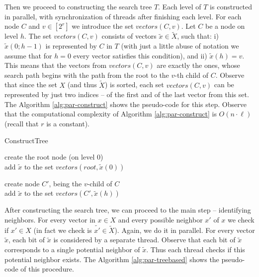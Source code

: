 \documentclass[a4paper]{article}
\begin{document}
Then we proceed to constructing the search tree $T$.
Each level of $T$ is constructed in parallel, with synchronization of threads after finishing each level.
For each node $C$ and $v \in [2^r]$ we introduce the set $vectors(C, v)$. Let $C$ be a node on level $h$.
The set $vectors(C,v)$ consists of vectors $\widetilde x \in \widetilde X$, such that: i) $\widetilde x(0 ; h-1)$ is represented by $C$ in $T$ (with just a little abuse of notation we assume that for $h=0$ every vector satisfies this condition), and ii) $\widetilde x (h) = v$.
This means that the vectors from $vectors(C,v)$ are exactly the ones, whose search path begins with the path from the root to the $v$-th child of $C$. Observe that since the set $X$ (and thus $\widetilde X$) is sorted, each set $vectors(C,v)$ can be represented by just two indices -- of the first and of the last vector from this set.
The Algorithm \ref{alg:par-construct} shows the pseudo-code for this step. Observe that the computational complexity of Algorithm \ref{alg:par-construct} is $O(n \cdot \ell)$ (recall that $r$ is a constant).

\begin{algorithm}[htb]
\small
\caption {ConstructTree}
\label{alg:par-construct}
create the root node (on level 0)\\
		{
			add $\widetilde x$ to the set $vectors(root, \widetilde x(0))$
		}	


{
{
	{
		create node $C'$, being the $v$-child of $C$\\
		{
			add $\widetilde x$ to the set $vectors(C', \widetilde x(h))$
		}	
	}	
}
}

\end{algorithm}

After constructing the search tree, we can proceed to the main step -- identifying neighbors.
For every vector in $x \in X$ and every possible neighbor $x'$ of $x$ we check if $x' \in X$ (in fact we check is $\widetilde{x'} \in \widetilde X$). Again, we do it in parallel.
For every vector $\widetilde x$, each bit of $\widetilde x$ is considered by a separate thread.
Observe that each bit of $\widetilde x$ corresponds to a single potential neighbor of $\widetilde x$. Thus each thread checks if this potential neighbor exists. The Algorithm \ref{alg:par-treebased} shows the pseudo-code of this procedure.
\end{document}
